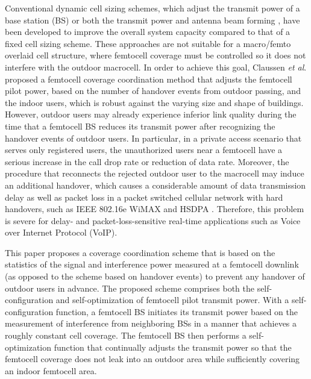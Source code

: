 \documentclass[draftclsnofoot,12pt,onecolumn]{IEEEtran}
\begin{document}
Conventional dynamic cell sizing schemes, which adjust the transmit
power of a base station (BS) \cite{DynamicCell1}\cite{DynamicCell3}
or both the transmit power and antenna beam forming
\cite{DynamicCell2}, have been developed to improve the overall
system capacity compared to that of a fixed cell sizing scheme. These approaches are not suitable for a macro/femto overlaid cell
structure, where femtocell coverage must be controlled so it does
not interfere with the outdoor macrocell. In order to achieve this
goal, Claussen \textit{et al}. \cite{DynamicCell4} proposed a
femtocell coverage coordination method that adjusts the femtocell
pilot power, based on the number of handover events from outdoor
passing, and the indoor users, which is robust against the varying
size and shape of buildings. However, outdoor users may already
experience inferior link quality during the time that a femtocell BS
reduces its transmit power after recognizing the handover events of
outdoor users. In particular, in a private access scenario that
serves only registered users, the unauthorized users near a
femtocell have a serious increase in the call drop rate or reduction
of data rate. Moreover, the procedure that reconnects the rejected
outdoor user to the macrocell may induce an additional handover,
which causes a considerable amount of data transmission delay as
well as packet loss in a packet switched cellular network with hard
handovers, such as IEEE 802.16e WiMAX and HSDPA
\cite{HOwimax}\cite{HOhsdpa}. Therefore, this problem is severe for
delay- and packet-loss-sensitive real-time applications such as
Voice over Internet Protocol (VoIP).

This paper proposes a coverage coordination scheme that is based on
the statistics of the signal and interference power measured at a
femtocell downlink (as opposed to the scheme based on handover
events) to prevent any handover of outdoor users in advance. The
proposed scheme comprises both the self-configuration and
self-optimization of femtocell pilot transmit power. With a
self-configuration function, a femtocell BS initiates its transmit
power based on the measurement of interference from neighboring BSs
in a manner that achieves a roughly constant cell coverage. The
femtocell BS then performs a self-optimization function that
continually adjusts the transmit power so that the femtocell
coverage does not leak into an outdoor area while sufficiently
covering an indoor femtocell area.
\end{document}

